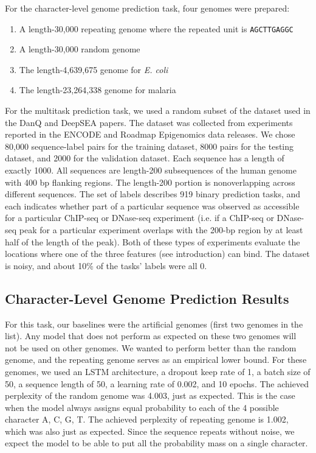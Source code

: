 \documentclass{article} %
\begin{document}
For the character-level genome prediction task, four genomes were prepared:
\begin{enumerate}
	\item A length-30,000 repeating genome where the repeated unit is \texttt{AGCTTGAGGC}
	\item A length-30,000 random genome
	\item The length-4,639,675 genome for \textit{E. coli}
	\item The length-23,264,338 genome for malaria
\end{enumerate}

For the multitask prediction task, we used a random subset of the dataset used in the DanQ \cite{quang2015danq} and DeepSEA \cite{zhou2015predicting} papers. The dataset was collected from experiments reported in the ENCODE and Roadmap Epigenomics data releases. We chose 80,000 sequence-label pairs for the training dataset, 8000 pairs for the testing dataset, and 2000 for the validation dataset. Each sequence has a length of exactly 1000. All sequences are length-200 subsequences of the human genome with 400 bp flanking regions. The length-200 portion is nonoverlapping across different sequences. The set of labels describes 919 binary prediction tasks, and each indicates whether part of a particular sequence was observed as accessible for a particular ChIP-seq or DNase-seq experiment (i.e. if a ChIP-seq or DNase-seq peak for a particular experiment overlaps with the 200-bp region by at least half of the length of the peak). Both of these types of experiments evaluate the locations where one of the three features (see introduction) can bind. The dataset is noisy, and about 10\% of the tasks' labels were all 0.

\subsection{Character-Level Genome Prediction Results}

For this task, our baselines were the artificial genomes (first two genomes in the list). Any model that does not perform as expected on these two genomes will not be used on other genomes. We wanted to perform better than the random genome, and the repeating genome serves as an empirical lower bound. For these genomes, we used an LSTM architecture, a dropout keep rate of 1, a batch size of 50, a sequence length of 50, a learning rate of 0.002, and 10 epochs. The achieved perplexity of the random genome was 4.003, just as expected. This is the case when the model always assigns equal probability to each of the 4 possible character A, C, G, T. The achieved perplexity of repeating genome is 1.002, which was also just as expected. Since the sequence repeats without noise, we expect the model to be able to put all the probability mass on a single character.
\end{document}

